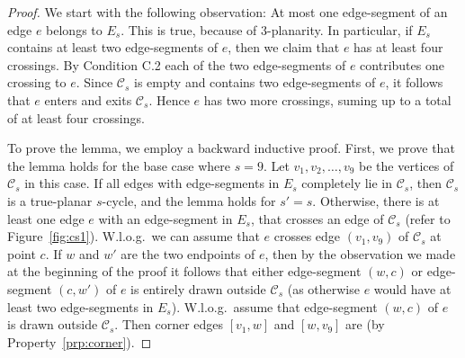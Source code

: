 \begin{proof}
We start with the following observation: At most one edge-segment of an edge $e$ belongs to $E_s$. This is true, because of $3$-planarity. In particular, if $E_s$ contains at least two edge-segments of $e$, then we claim that $e$ has at least four crossings. By Condition C.2 each of the two edge-segments of $e$ contributes one crossing to $e$. Since $\mathcal{C}_s$ is empty and contains two edge-segments of $e$, it follows that $e$ enters and exits $\mathcal{C}_s$. Hence $e$ has two more crossings, suming up to a total of at least four crossings. 

To prove the lemma, we employ a backward inductive proof. First, we prove that the lemma holds for the base case where $s=9$. Let $v_1,v_2,\dots,v_9$ be the vertices of $\mathcal{C}_s$ in this case. If all edges with edge-segments in $E_s$ completely lie in $\mathcal{C}_s$,  then $\mathcal{C}_s$ is a true-planar $s$-cycle, and the lemma holds for $s'=s$. Otherwise, there is at least one edge $e$ with an edge-segment in $E_s$, that crosses an edge of $\mathcal{C}_s$ (refer to Figure~\ref{fig:cs1}). W.l.o.g.~we can assume that $e$ crosses edge $(v_1,v_9)$ of $\mathcal{C}_s$ at point $c$. If $w$ and $w'$ are the two endpoints of $e$, then by the observation we made at the beginning of the proof it follows that either edge-segment $(w,c)$ or edge-segment $(c,w')$ of $e$ is entirely drawn outside $\mathcal{C}_s$ (as otherwise $e$ would have at least two edge-segments in $E_{s}$). W.l.o.g.~assume that edge-segment $(w,c)$ of $e$ is drawn outside $\mathcal{C}_s$. Then corner edges $[v_1,w]$ and $[w,v_9]$ are \pes (by Property~\ref{prp:corner}). 


\end{proof}
